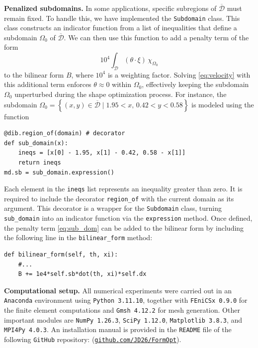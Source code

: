 \documentclass[preprint,9pt]{elsarticle}
\begin{document}
\vspace{0.5cm}
\noindent\textbf{Penalized subdomains.}
In some applications, specific subregions of $\overline{\mathcal{D}}$
must remain fixed. 
To handle this, we have implemented the \texttt{Subdomain} class.
This class constructs an indicator function from a list of inequalities that
define a subdomain $\Omega_0$ of $\overline{\mathcal{D}}$.
We can then use this function to add a penalty term of the form
\begin{equation}\label{eq:sub_dom}
	{10}^4 \int_{\mathcal{D}} (\theta \cdot \xi)\, \chi_{\Omega_0}
\end{equation}
to the bilinear form $B$, where ${10}^4$ is a weighting factor.
Solving \eqref{eq:velocity} with this additional term enforces
$\theta \approx 0$ within $\Omega_0$, effectively keeping
the subdomain $\Omega_0$ unperturbed during the shape optimization process.
For instance, the subdomain
$
	\Omega_0=\left\{
		(x,y)\in \overline{\mathcal{D}} \mid 1.95<x,\, 0.42<y<0.58
	\right\}
$
is modeled using the function
\begin{lstlisting}
@dib.region_of(domain) # decorator
def sub_domain(x):
    ineqs = [x[0] - 1.95, x[1] - 0.42, 0.58 - x[1]]
    return ineqs
md.sb = sub_domain.expression()
\end{lstlisting}
Each element in the \texttt{ineqs} list represents an inequality greater than zero.
It is required to include the decorator \texttt{region\_of} with the
current domain as its argument.
This decorator is a wrapper for the \texttt{Subdomain} class,
turning \texttt{sub\_domain} into an indicator function via
the \texttt{expression} method.
Once defined, the penalty term \eqref{eq:sub_dom}
can be added to the bilinear form by including the
following line in the \texttt{bilinear\_form} method:
\begin{lstlisting}
def bilinear_form(self, th, xi):
	#...
	B += 1e4*self.sb*dot(th, xi)*self.dx
\end{lstlisting}

\vspace{0.5cm}
\noindent \textbf{Computational setup.}
All numerical experiments were carried out in an \texttt{Anaconda} environment
using \texttt{Python~3.11.10}, together with \texttt{FEniCSx~0.9.0} for
the finite element computations and \texttt{Gmsh~4.12.2} for mesh generation.
Other important modules are \texttt{NumPy~1.26.3}, \texttt{SciPy~1.12.0},
\texttt{Matplotlib~3.8.3}, and \texttt{MPI4Py~4.0.3}.
An installation manual is provided in the \texttt{README} file of
the following \texttt{GitHub} repository:
(\href{https://github.com/JD26/FormOpt}{\texttt{github.com/JD26/FormOpt}}).
\end{document}
